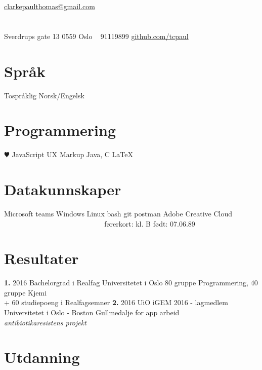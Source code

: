 \documentclass[]{friggeri-cv}
\begin{document}
       {\Letter \href{mailto:clarkepaulthomas@gmail.com}{ clarkepaulthomas@gmail.com}}


\begin{aside}
  \section{}{Sverdrups gate 13 } 
    0559 Oslo
    ~
    {91119899 } \Mobilefone 
    \href{https://github.com/tcpaul}{github.com/tcpaul } \faGithub
  \section{Språk}
    Tospråklig Norsk/Engelsk
  \section{Programmering}
    {\color{red} $\varheartsuit$} JavaScript
    UX Markup
    Java, C
    \LaTeX
  \section{Datakunnskaper}
    Microsoft teams
    Windows
    Linux
    bash
    git
    postman
    Adobe Creative Cloud
    ~
    ~
    ~
    ~
    ~
    ~
    ~
    ~
    ~
    ~
    ~
    ~
    ~
    ~
    ~
    ~
    ~
    ~
    ~
    ~
    ~
    førerkort: kl. B
    født: 07.06.89
\end{aside}

\section{Resultater \faTrophy}

\begin{entrylist}
  \entry
    {\textbf{1.} 2016}
    {Bachelorgrad i Realfag}
    {Universitetet i Oslo}
    {80 gruppe Programmering, 40 gruppe Kjemi\\ + 60 studiepoeng i Realfagsemner}
  \entry
    {\textbf{2.} 2016}
    {UiO iGEM 2016 - lagmedlem}
    {Universitetet i Oslo - Boston}
    {Gullmedalje for app arbeid \\ \emph{antibiotikaresistens projekt}}
\end{entrylist}

\section{Utdanning}
\end{document}
